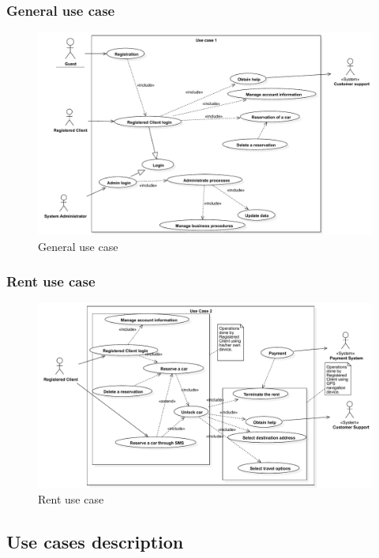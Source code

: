 \subsubsection{General use case}
\begin{figure}[H]
\centering
\includegraphics[width=\textwidth, keepaspectratio]{../images/diagram/use_cases/general.pdf}
\caption{General use case}
\end{figure}

\subsubsection{Rent use case}
\begin{figure}[H]
\centering
\includegraphics[width=\textwidth, keepaspectratio]{../images/diagram/use_cases/rent.pdf}
\caption{Rent use case}
\end{figure}

\clearpage
\subsection{Use cases description}
